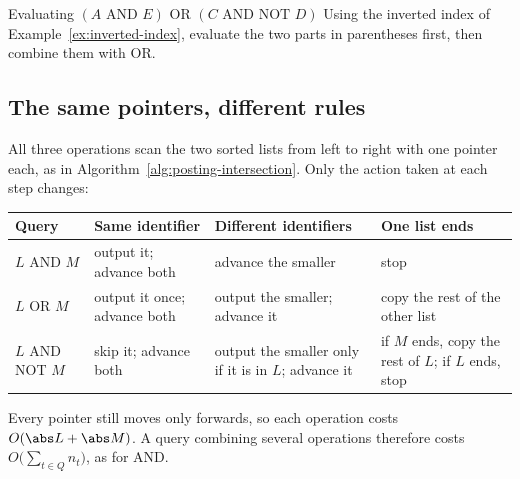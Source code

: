 \documentclass[a4paper,12pt,oneside]{report}
\begin{document}
\begin{framedexample}{Evaluating $(A\text{ AND }E)\text{ OR }(C\text{ AND NOT }D)$}
Using the inverted index of Example~\ref{ex:inverted-index}, evaluate
the two parts in parentheses first, then combine them with OR.
\begin{center}
\end{center}
\end{framedexample}

\subsection{The same pointers, different rules}

All three operations scan the two sorted lists from left to right
with one pointer each, as in Algorithm~\ref{alg:posting-intersection}.
Only the action taken at each step changes:
\begin{center}
\small
\begin{tabular}{l|>{\raggedright\arraybackslash}p{3.2cm}%
  |>{\raggedright\arraybackslash}p{3.9cm}%
  |>{\raggedright\arraybackslash}p{3.6cm}}
  Query & Same identifier & Different identifiers & One list ends\\\hline
  $L$ AND $M$ & output it; advance both & advance the smaller & stop\\[2pt]
  $L$ OR $M$ & output it once; advance both & output the smaller; advance it
    & copy the rest of the other list\\[2pt]
  $L$ AND NOT $M$ & skip it; advance both & output the smaller only if it
    is in $L$; advance it & if $M$ ends, copy the rest of $L$; if $L$ ends,
    stop
\end{tabular}
\end{center}
Every pointer still moves only forwards, so each operation costs
$O(\abs L+\abs M)$. A query combining several operations therefore
costs $O\bigl(\sum_{t\in Q}n_t\bigr)$, as for AND.
\end{document}
